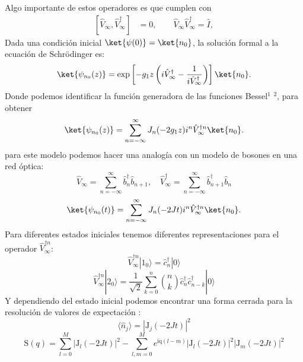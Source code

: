 Algo importante de estos operadores es que cumplen con
\begin{align*}
    \left[\hat{V}_\infty, \hat{V}_\infty^\dagger\right] &= 0, \qquad \hat{V}_\infty \hat{V}_\infty^\dagger = \hat{I},
\end{align*}
Dada una condición inicial $\ket{\psi(0)} = \ket{n_0}$, la solución formal a la ecuación de Schrödinger es:
\[
\ket{\psi_{n_0}(z)} = \exp\left[-g_1 z \left(i\hat{V}_\infty^\dagger - \frac{1}{i\hat{V}_\infty^\dagger}\right)\right] \ket{n_0}.
\]
Donde podemos identificar la función generadora de las funciones Bessel$^1$ $^2$, para obtener
\[
\ket{\psi_{n_0}(z)} = \sum_{n=-\infty}^{\infty} J_n(-2g_1 z)i^n \hat{V}_\infty^{\dagger n} \ket{n_0}.
\] 
para este modelo podemos hacer una analogía con un modelo de bosones en una red óptica:
\[
\hat{V}_\infty = \sum_{n=-\infty}^{\infty} \hat{b}_n^\dagger  \hat{b}_{n+1}, \quad \hat{V}_\infty^\dagger = \sum_{n=-\infty}^{\infty} \hat{b}_{n+1}^\dagger \hat{b}_{n}  
\] 
\[
\ket{\psi_{n_0}(t)} = \sum_{n=-\infty}^{\infty} J_n(-2 J t)i^n \hat{V}_\infty^{\dagger n} \ket{n_0}.
\]  
Para diferentes estados iniciales tenemos diferentes representaciones para el operador $\hat{V}^{\dagger n}_\infty$: 
\[
\hat{V}^{\dagger n}_\infty |1_0\rangle = \hat{c}^\dagger_n |0\rangle
\] 
\[
\hat{V}^{\dagger n}_\infty |2_0\rangle = \frac{1}{\sqrt{2}} \sum_{k=0}^n \binom{n}{k} \hat{c}^\dagger_n \hat{c}^\dagger_{n-k} |0\rangle
\]  
Y dependiendo del estado inicial podemos encontrar una forma cerrada para la resolución de valores de expectación : 
\[ 
\langle \hat{n}_j \rangle = |\mathrm{J}_j ( -2Jt)|^2
\] 
\[ 
\mathrm{S}(q) = \sum_{l=0}^M |\mathrm{J}_l ( -2Jt)|^2 - \sum_{l, m=0}^M e^{\mathrm{iq}(l-m)} |\mathrm{J}_l ( -2Jt)|^2  |\mathrm{J}_m ( -2Jt)|^2
\] 